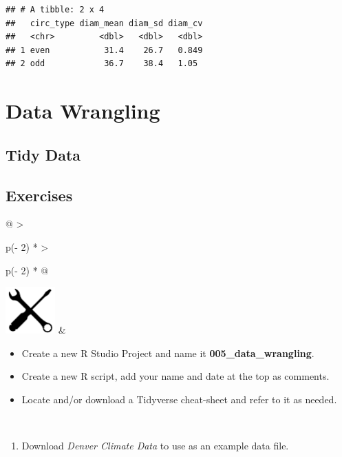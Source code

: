 \documentclass[
]{book}
\providecommand{\tightlist}{%
  \setlength{\itemsep}{0pt}\setlength{\parskip}{0pt}}
\begin{document}
\begin{verbatim}
## # A tibble: 2 x 4
##   circ_type diam_mean diam_sd diam_cv
##   <chr>         <dbl>   <dbl>   <dbl>
## 1 even           31.4    26.7   0.849
## 2 odd            36.7    38.4   1.05
\end{verbatim}

\hypertarget{data-wrangling}{%
\chapter{Data Wrangling}\label{data-wrangling}}

\hypertarget{tidy-data}{%
\section{Tidy Data}\label{tidy-data}}

\hypertarget{exercises-4}{%
\section*{Exercises}\label{exercises-4}}

\begin{longtable}[]{@{}
  >{\raggedright\arraybackslash}p{(\columnwidth - 2\tabcolsep) * }
  >{\raggedright\arraybackslash}p{(\columnwidth - 2\tabcolsep) * }@{}}
\toprule\noalign{}
\endhead
\bottomrule\noalign{}
\endlastfoot
\includegraphics[width=\textwidth,height=0.70833in]{images/07.png} & \begin{minipage}[t]{\linewidth}\raggedright
\begin{itemize}
\item
  Create a new R Studio Project and name it \textbf{005\_data\_wrangling}.
\item
  Create a new R script, add your name and date at the top as comments.
\item
  Locate and/or download a Tidyverse cheat-sheet and refer to it as needed.
\end{itemize}
\end{minipage} \\
\end{longtable}

\begin{enumerate}
\def\labelenumi{\arabic{enumi}.}
\tightlist
\item
  Download \emph{Denver Climate Data} to use as an example data file.
\end{enumerate}
\end{document}
